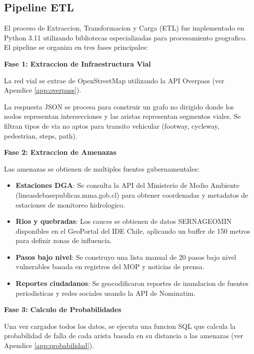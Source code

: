 \documentclass[conference]{IEEEtran}
\begin{document}
\subsection{Pipeline ETL}

El proceso de Extraccion, Transformacion y Carga (ETL) fue implementado en Python 3.11 utilizando bibliotecas especializadas para procesamiento geografico. El pipeline se organiza en tres fases principales:

\textbf{Fase 1: Extraccion de Infraestructura Vial}

La red vial se extrae de OpenStreetMap utilizando la API Overpass (ver Apendice \ref{app:overpass}).

La respuesta JSON se procesa para construir un grafo no dirigido donde los nodos representan intersecciones y las aristas representan segmentos viales. Se filtran tipos de via no aptos para transito vehicular (footway, cycleway, pedestrian, steps, path).

\textbf{Fase 2: Extraccion de Amenazas}

Las amenazas se obtienen de multiples fuentes gubernamentales:

\begin{itemize}
    \item \textbf{Estaciones DGA}: Se consulta la API del Ministerio de Medio Ambiente (lineasdebasepublicas.mma.gob.cl) para obtener coordenadas y metadatos de estaciones de monitoreo hidrologico.

    \item \textbf{Rios y quebradas}: Los cauces se obtienen de datos SERNAGEOMIN disponibles en el GeoPortal del IDE Chile, aplicando un buffer de 150 metros para definir zonas de influencia.

    \item \textbf{Pasos bajo nivel}: Se construyo una lista manual de 20 pasos bajo nivel vulnerables basada en registros del MOP y noticias de prensa.

    \item \textbf{Reportes ciudadanos}: Se geocodificaron reportes de inundacion de fuentes periodisticas y redes sociales usando la API de Nominatim.
\end{itemize}

\textbf{Fase 3: Calculo de Probabilidades}

Una vez cargados todos los datos, se ejecuta una funcion SQL que calcula la probabilidad de falla de cada arista basada en su distancia a las amenazas (ver Apendice \ref{app:probabilidad}).
\end{document}
